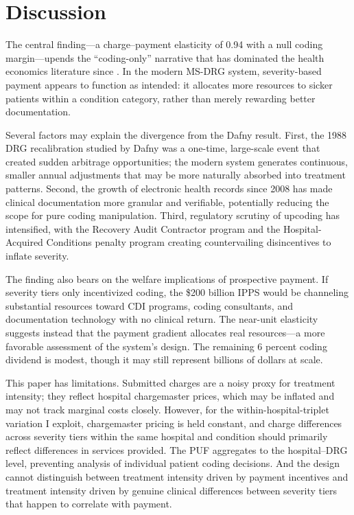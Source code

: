 \documentclass[12pt]{article}
\begin{document}
\section{Discussion}
\label{sec:discussion}

The central finding---a charge--payment elasticity of 0.94 with a null coding margin---upends the ``coding-only'' narrative that has dominated the health economics literature since \citet{dafny2005}. In the modern MS-DRG system, severity-based payment appears to function as intended: it allocates more resources to sicker patients within a condition category, rather than merely rewarding better documentation.

Several factors may explain the divergence from the Dafny result. First, the 1988 DRG recalibration studied by Dafny was a one-time, large-scale event that created sudden arbitrage opportunities; the modern system generates continuous, smaller annual adjustments that may be more naturally absorbed into treatment patterns. Second, the growth of electronic health records since 2008 has made clinical documentation more granular and verifiable, potentially reducing the scope for pure coding manipulation. Third, regulatory scrutiny of upcoding has intensified, with the Recovery Audit Contractor program and the Hospital-Acquired Conditions penalty program creating countervailing disincentives to inflate severity.

The finding also bears on the welfare implications of prospective payment. If severity tiers only incentivized coding, the \$200 billion IPPS would be channeling substantial resources toward CDI programs, coding consultants, and documentation technology with no clinical return. The near-unit elasticity suggests instead that the payment gradient allocates real resources---a more favorable assessment of the system's design. The remaining 6 percent coding dividend is modest, though it may still represent billions of dollars at scale.

This paper has limitations. Submitted charges are a noisy proxy for treatment intensity; they reflect hospital chargemaster prices, which may be inflated and may not track marginal costs closely. However, for the within-hospital-triplet variation I exploit, chargemaster pricing is held constant, and charge differences across severity tiers within the same hospital and condition should primarily reflect differences in services provided. The PUF aggregates to the hospital--DRG level, preventing analysis of individual patient coding decisions. And the design cannot distinguish between treatment intensity driven by payment incentives and treatment intensity driven by genuine clinical differences between severity tiers that happen to correlate with payment.
\end{document}
